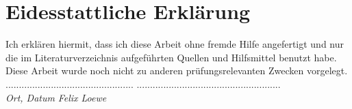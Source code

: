 \documentclass[a4paper,ngerman,oneside,titlepage,bibliography=totoc,11pt]{scrreprt}
\begin{document}
\chapter*{Eidesstattliche Erklärung}

Ich erklären hiermit, dass ich diese Arbeit ohne fremde Hilfe angefertigt und nur die im Literaturverzeichnis aufgeführten Quellen und Hilfsmittel benutzt habe. Diese Arbeit wurde noch nicht zu anderen prüfungsrelevanten Zwecken vorgelegt.\\[1.5cm]

\noindent ................................................
\qquad\qquad\qquad\qquad\qquad
......................................................\\[0.5mm]
\textit{Ort, Datum}
\qquad\qquad\qquad\qquad\qquad\qquad\qquad\qquad\qquad
\textit{Felix Loewe}
\end{document}
